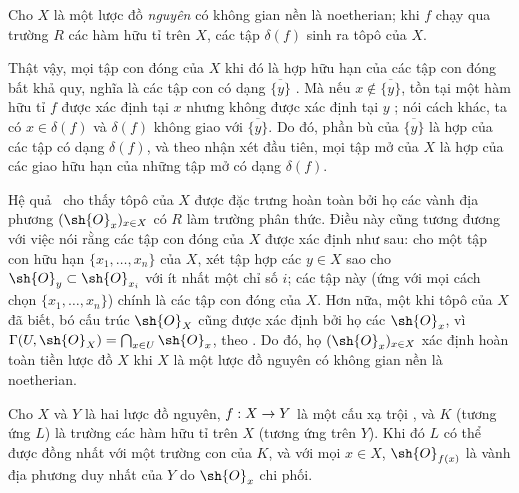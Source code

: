 \documentclass[oneside]{amsart}
\makeatletter
\newcommand{\ega@arrow}[2]{\mathchoice{#1}{#2}{#2}{#2}}
\renewcommand{\to}{\ega@arrow{\longrightarrow}{\rightarrow}}
\let\EGAOriginalLabel\label
\renewcommand{\label}[1]{\phantomsection\EGAOriginalLabel{#1}}
\makeatother
\begin{document}
\begin{corollary}[8.2.5]
\label{I.8.2.5}
Cho $X$ là một lược đồ \emph{nguyên} có không gian nền là noetherian;
khi $f$ chạy qua trường $R$ các hàm hữu tỉ trên $X$, các tập $\delta(f)$ sinh ra tôpô của $X$.
\end{corollary}

Thật vậy, mọi tập con đóng của $X$ khi đó là hợp hữu hạn của các tập con đóng bất khả quy, nghĩa là các tập con có dạng $\overline{\{y\}}$ .
Mà nếu $x\not\in\overline{\{y\}}$, tồn tại một hàm hữu tỉ $f$ được xác định tại $x$ nhưng không được xác định tại $y$ ; nói cách khác, ta có $x\in\delta(f)$ và $\delta(f)$ không giao với $\overline{\{y\}}$.
Do đó, phần bù của $\overline{\{y\}}$ là hợp của các tập có dạng $\delta(f)$, và theo nhận xét đầu tiên, mọi tập mở của $X$ là hợp của các giao hữu hạn của những tập mở có dạng $\delta(f)$.

\begin{env}[8.2.6]
\label{I.8.2.6}
Hệ quả~ cho thấy tôpô của $X$ được đặc trưng hoàn toàn bởi họ các vành địa phương $(\sh{O}_x)_{x\in X}$ có $R$ làm trường phân thức.
Điều này cũng tương đương với việc nói rằng các tập con đóng của $X$ được xác định như sau: cho một tập con hữu hạn $\{x_1,\ldots,x_n\}$ của $X$, xét tập hợp các $y\in X$ sao cho $\sh{O}_y\subset\sh{O}_{x_i}$ với ít nhất một chỉ số $i$; các tập này (ứng với mọi cách chọn $\{x_1,\ldots,x_n\}$) chính là các tập con đóng của $X$.
Hơn nữa, một khi tôpô của $X$ đã biết, bó cấu trúc $\sh{O}_X$ cũng được xác định bởi họ các $\sh{O}_x$, vì $\Gamma(U,\sh{O}_X)=\bigcap_{x\in U}\sh{O}_x$, theo .
Do đó, họ $(\sh{O}_x)_{x\in X}$ xác định hoàn toàn tiền lược đồ $X$ khi $X$ là một lược đồ nguyên có không gian nền là noetherian.
\end{env}

\begin{proposition}[8.2.7]
\label{I.8.2.7}
Cho $X$ và $Y$ là hai lược đồ nguyên, $f:X\to Y$ là một cấu xạ trội , và $K$ (tương ứng $L$) là trường các hàm hữu tỉ trên $X$ (tương ứng trên $Y$).
Khi đó $L$ có thể được đồng nhất với một trường con của $K$, và với mọi $x\in X$, $\sh{O}_{f(x)}$ là vành địa phương duy nhất của $Y$ do $\sh{O}_x$ chi phối.
\end{proposition}
\end{document}
